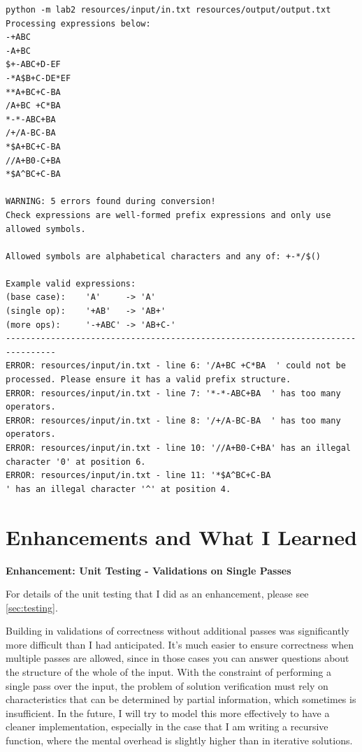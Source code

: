 \documentclass[10pt,letterpaper,final]{report}
\begin{document}
\begin{verbatim}
python -m lab2 resources/input/in.txt resources/output/output.txt    
Processing expressions below:
-+ABC
-A+BC
$+-ABC+D-EF
-*A$B+C-DE*EF
**A+BC+C-BA
/A+BC +C*BA  
*-*-ABC+BA  
/+/A-BC-BA  
*$A+BC+C-BA 
//A+B0-C+BA
*$A^BC+C-BA

WARNING: 5 errors found during conversion!
Check expressions are well-formed prefix expressions and only use allowed symbols.

Allowed symbols are alphabetical characters and any of: +-*/$()

Example valid expressions:
(base case):    'A'     -> 'A'
(single op):    '+AB'   -> 'AB+'
(more ops):     '-+ABC' -> 'AB+C-'
--------------------------------------------------------------------------------
ERROR: resources/input/in.txt - line 6: '/A+BC +C*BA  ' could not be processed. Please ensure it has a valid prefix structure.
ERROR: resources/input/in.txt - line 7: '*-*-ABC+BA  ' has too many operators.
ERROR: resources/input/in.txt - line 8: '/+/A-BC-BA  ' has too many operators.
ERROR: resources/input/in.txt - line 10: '//A+B0-C+BA' has an illegal character '0' at position 6.
ERROR: resources/input/in.txt - line 11: '*$A^BC+C-BA                                   ' has an illegal character '^' at position 4.
\end{verbatim}

\pagebreak
\section{Enhancements and What I Learned}\label{sec:enhancements-and-what-I-learned}

\noindent \textbf{Enhancement: Unit Testing - Validations on Single Passes}
\medskip

For details of the unit testing that I did as an enhancement, please see \ref{sec:testing}.

Building in validations of correctness without additional passes was significantly more difficult than I had anticipated. It's much easier to ensure correctness when multiple passes are allowed, since in those cases you can answer questions about the structure of the whole of the input. With the constraint of performing a single pass over the input, the problem of solution verification must rely on characteristics that can be determined by partial information, which sometimes is insufficient. In the future, I will try to model this more effectively to have a cleaner implementation, especially in the case that I am writing a recursive function, where the mental overhead is slightly higher than in iterative solutions.
\end{document}
